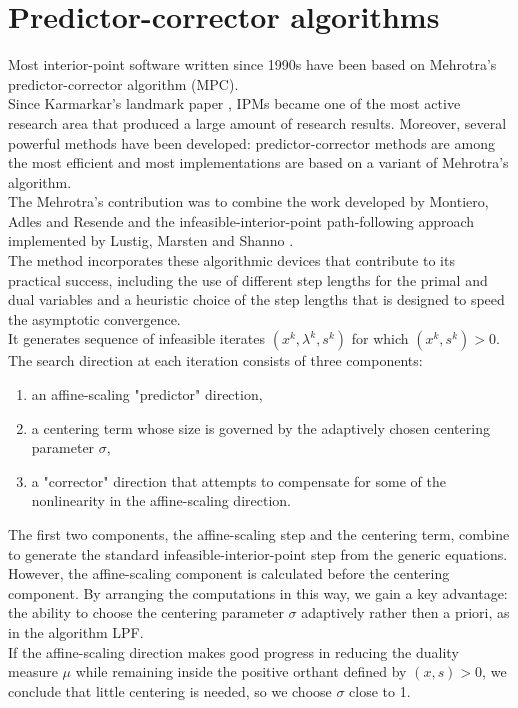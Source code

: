 \documentclass[a4paper,10 pt,titlepage,twoside]{book}
\theoremstyle{plain}
\theoremstyle{definition}
\theoremstyle{remark}
\begin{document}
\section{Predictor-corrector algorithms}
Most interior-point software written since 1990s have been based on Mehrotra's predictor-corrector algorithm (MPC).\\
Since Karmarkar's landmark paper \cite{Kar}, IPMs became one of the most active research area that produced a large amount of research results. Moreover, several powerful methods have been developed: predictor-corrector methods are among the most efficient and most implementations are based on a variant of Mehrotra's algorithm. \\
The Mehrotra's contribution was to combine the work developed by Montiero, Adles and Resende \cite{MARE} and the infeasible-interior-point path-following approach implemented by Lustig, Marsten and Shanno \cite{LMS}.\\ 
The method incorporates these algorithmic devices that contribute to its practical success, including the use of different step lengths for the primal and dual variables and a heuristic choice of the step lengths that is designed to speed the asymptotic convergence.\\
It generates sequence of infeasible iterates $(x^{k},\lambda^{k},s^{k})$ for which $(x^{k},s^{k})>0$. The search direction at each iteration consists of three components:
\begin{enumerate}
	\item an affine-scaling "predictor" direction,
	\item a centering term whose size is governed by the adaptively chosen centering parameter $\sigma$,
	\item a "corrector" direction that attempts to compensate for some of the nonlinearity in the affine-scaling direction.
	\end{enumerate}
The first two components, the affine-scaling step and the centering term, combine to generate the standard infeasible-interior-point step from the generic equations. However, the affine-scaling component is calculated before the centering component. By arranging the computations in this way, we gain a key advantage: the ability to choose the centering parameter $\sigma$ adaptively rather then a priori, as in the algorithm LPF.\\
If the affine-scaling direction makes good progress in reducing the duality measure $\mu$ while remaining inside the positive orthant defined by $(x,s)>0$, we conclude that little centering is needed, so we choose $\sigma$ close to 1.
\end{document}
